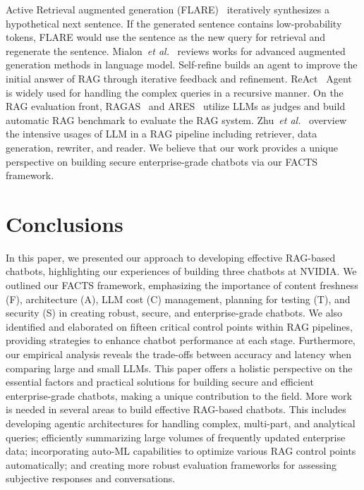 \documentclass[sigconf]{acmart}
\begin{document}
Active Retrieval augmented generation (FLARE)~\cite{jiang2023active} iteratively synthesizes a hypothetical next sentence. If the generated sentence  contains low-probability tokens,  FLARE would use the sentence as the new query for retrieval and regenerate the sentence. Mialon~\emph{et al.}~\cite{mialon2023augmented} reviews works for advanced augmented generation methods in language model. Self-refine \cite{madaan2024self} builds an agent to improve the initial answer of RAG through iterative feedback and refinement. ReAct~\cite{yao2022react} Agent is widely used for handling the complex queries in a recursive manner.  On the RAG evaluation front, RAGAS~\cite{es2023ragas} and ARES~\cite{saad2023ares} utilize LLMs as judges and build automatic RAG benchmark to evaluate the RAG system.  Zhu~\emph{et al.}~\cite{zhu2023large} overview the intensive usages of LLM in a RAG pipeline including retriever, data generation, rewriter, and reader. We believe that our work provides a unique perspective on building secure enterprise-grade chatbots via our FACTS framework. 
 
\section{Conclusions}
In this paper, we presented our approach to developing effective RAG-based chatbots, highlighting our experiences of building three chatbots at NVIDIA. We outlined our FACTS framework, emphasizing the importance of content freshness (F), architecture (A), LLM cost (C) management, planning for testing (T), and security (S) in creating robust, secure, and enterprise-grade chatbots. We also identified and elaborated on fifteen critical control points within RAG pipelines, providing strategies to enhance chatbot performance at each stage. Furthermore, our empirical analysis reveals the trade-offs between accuracy and latency when comparing large and small LLMs. This paper offers a holistic perspective on the essential factors and practical solutions for building secure and efficient enterprise-grade chatbots, making a unique contribution to the field. 
More work is needed in several areas to build effective RAG-based chatbots. This includes developing agentic architectures for handling complex, multi-part, and analytical queries; efficiently summarizing large volumes of frequently updated enterprise data; incorporating auto-ML capabilities to optimize various RAG control points automatically; and creating more robust evaluation frameworks for assessing subjective responses and conversations.






\end{document}
